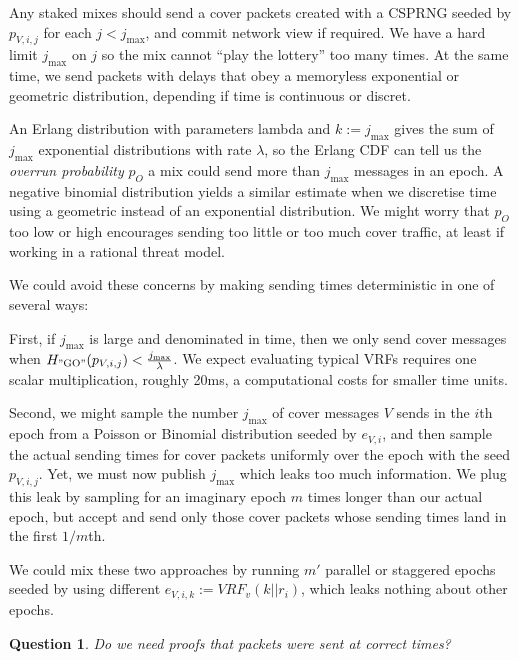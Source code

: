 ﻿\documentclass{sig-alternate-hotpets}
\newtheorem{question}{Question}
\begin{document}
Any staked mixes should send a cover packets created with a CSPRNG seeded by $p_{V,i,j}$ for each $j < j_{\max}$, and commit network view if required.  We have a hard limit $j_{\max}$ on $j$ so the mix cannot ``play the lottery'' too many times.  At the same time, we send packets with delays that obey a memoryless exponential or geometric distribution, depending if time is continuous or discret. 

An Erlang distribution with parameters lambda and $k := j_{\max}$ gives the sum of $j_{\max}$ exponential distributions with rate $\lambda$, so the Erlang CDF can tell us the {\em overrun probability} $p_O$ a mix could send more than $j_{\max}$ messages in an epoch.  A negative binomial distribution yields a similar estimate when we discretise time using a geometric instead of an exponential distribution.  We might worry that $p_O$ too low or high encourages sending too little or too much cover traffic, at least if working in a rational threat model.  

We could avoid these concerns by making sending times deterministic in
one of several ways:

First, if $j_{\max}$ is large and denominated in time, then we only send 
cover messages when $H_{\mathrm{"GO"}}(p_{V,i,j}) < {j_{\max} \over \lambda}$. 
We expect evaluating typical VRFs requires one scalar multiplication,
roughly 20ms, a computational costs for smaller time units.

Second, we might sample the number $j_{\max}$ of cover messages $V$
sends in the $i$th epoch from a Poisson or Binomial distribution seeded
by $e_{V,i}$, and then sample the actual sending times for cover packets
uniformly over the epoch with the seed $p_{V,i,j}$.  Yet, we must now
publish $j_{\max}$ which leaks too much information.  We plug this leak
by sampling for an imaginary epoch $m$ times longer than our actual
epoch, but accept and send only those cover packets whose sending times
land in the first $1/m$th.  

We could mix these two approaches by running $m'$ parallel or staggered
epochs seeded by using different $e_{V,i,k} := VRF_v(k || r_i)$, which
leaks nothing about other epochs.  

\begin{question}
Do we need proofs that packets were sent at correct times?
\end{question}
\end{document}
